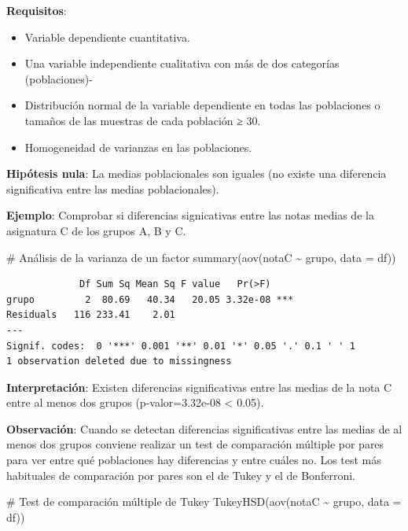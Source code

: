 \documentclass[
  a4paper,
]{scrreport}
\newenvironment{Shaded}{\begin{snugshade}}{\end{snugshade}}
\newcommand{\AttributeTok}[1]{\textcolor[rgb]{0.40,0.45,0.13}{#1}}
\newcommand{\CommentTok}[1]{\textcolor[rgb]{0.37,0.37,0.37}{#1}}
\newcommand{\FunctionTok}[1]{\textcolor[rgb]{0.28,0.35,0.67}{#1}}
\newcommand{\NormalTok}[1]{\textcolor[rgb]{0.00,0.23,0.31}{#1}}
\newcommand{\SpecialCharTok}[1]{\textcolor[rgb]{0.37,0.37,0.37}{#1}}
\providecommand{\tightlist}{%
  \setlength{\itemsep}{0pt}\setlength{\parskip}{0pt}}\usepackage{longtable,booktabs,array}
\theoremstyle{definition}
\theoremstyle{definition}
\theoremstyle{remark}
\begin{document}
\textbf{Requisitos}:

\begin{itemize}
\tightlist
\item
  Variable dependiente cuantitativa.
\item
  Una variable independiente cualitativa con más de dos categorías
  (poblaciones)-
\item
  Distribución normal de la variable dependiente en todas las
  poblaciones o tamaños de las muestras de cada población ≥ 30.
\item
  Homogeneidad de varianzas en las poblaciones.
\end{itemize}

\textbf{Hipótesis nula}: La medias poblacionales son iguales (no existe
una diferencia significativa entre las medias poblacionales).

\textbf{Ejemplo}: Comprobar si diferencias signicativas entre las notas
medias de la asignatura C de los grupos A, B y C.

\begin{Shaded}
\begin{Highlighting}[]
\CommentTok{\# Análisis de la varianza de un factor}
\FunctionTok{summary}\NormalTok{(}\FunctionTok{aov}\NormalTok{(notaC }\SpecialCharTok{\textasciitilde{}}\NormalTok{ grupo, }\AttributeTok{data =}\NormalTok{ df))}
\end{Highlighting}
\end{Shaded}

\begin{verbatim}
             Df Sum Sq Mean Sq F value   Pr(>F)    
grupo         2  80.69   40.34   20.05 3.32e-08 ***
Residuals   116 233.41    2.01                     
---
Signif. codes:  0 '***' 0.001 '**' 0.01 '*' 0.05 '.' 0.1 ' ' 1
1 observation deleted due to missingness
\end{verbatim}

\textbf{Interpretación}: Existen diferencias significativas entre las
medias de la nota C entre al menos dos grupos (p-valor=3.32e-08
\textless{} 0.05).

\textbf{Observación}: Cuando se detectan diferencias significativas
entre las medias de al menos dos grupos conviene realizar un test de
comparación múltiple por pares para ver entre qué poblaciones hay
diferencias y entre cuáles no. Los test más habituales de comparación
por pares son el de Tukey y el de Bonferroni.

\begin{Shaded}
\begin{Highlighting}[]
\CommentTok{\# Test de comparación múltiple de Tukey}
\FunctionTok{TukeyHSD}\NormalTok{(}\FunctionTok{aov}\NormalTok{(notaC }\SpecialCharTok{\textasciitilde{}}\NormalTok{ grupo, }\AttributeTok{data =}\NormalTok{ df))}
\end{Highlighting}
\end{Shaded}
\end{document}
